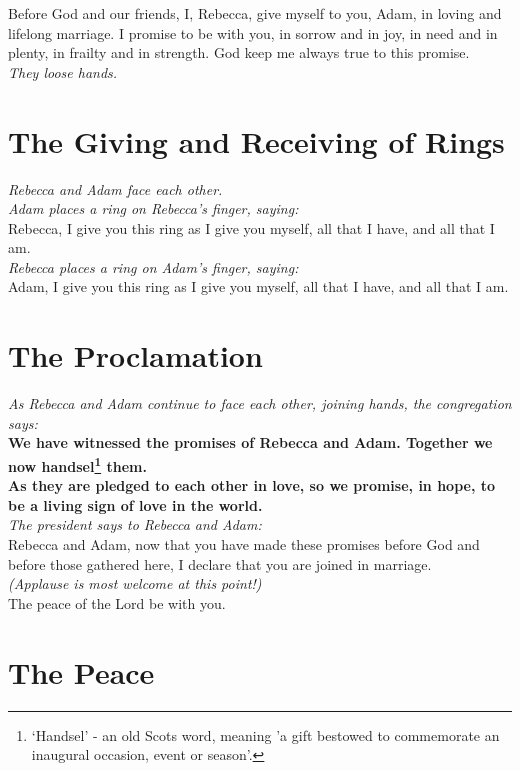 \documentclass[a4paper,12pt,titlepage]{article}
\begin{document}
Before God and our friends, I, Rebecca, give myself to you, Adam, in loving and lifelong marriage. I promise to be with you, in sorrow and in joy, in need and in plenty, in frailty and in strength. God keep me always true to this promise.\\

{\em They loose hands.}

\section{The Giving and Receiving of Rings}

{\em Rebecca and Adam face each other.}\\

{\em Adam places a ring on Rebecca's finger, saying:}\\
Rebecca, I give you this ring as I give you myself, all that I have, and all that I am.\\

{\em Rebecca places a ring on Adam's finger, saying:}\\
Adam, I give you this ring as I give you myself, all that I have, and all that I am.

\clearpage
\section{The Proclamation}

{\em As Rebecca and Adam continue to face each other, joining hands, the congregation says:}\\
{\bf We have witnessed the promises of Rebecca and Adam.
Together we now handsel\footnote{`Handsel' - an old Scots word, meaning 'a gift bestowed to commemorate an inaugural occasion, event or season'.} them.\\
As they are pledged to each other in love, so we promise, in hope, to be a living sign of love in the world.}\\

{\em The president says to Rebecca and Adam:}\\
Rebecca and Adam, now that you have made these promises before God and before those gathered here, I declare that you are joined in marriage.\\

{\em (Applause is most welcome at this point!)} \\ 

The peace of the Lord be with you.

\section{The Peace}
\end{document}
